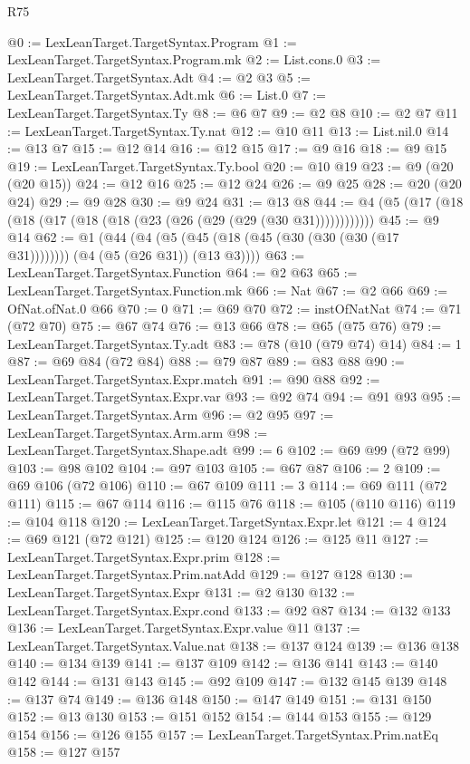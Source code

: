 \begin{lexlean}{R75}
\begin{coremodule}
@0 := LexLeanTarget.TargetSyntax.Program
@1 := LexLeanTarget.TargetSyntax.Program.mk
@2 := List.cons.{0}
@3 := LexLeanTarget.TargetSyntax.Adt
@4 := @2 @3
@5 := LexLeanTarget.TargetSyntax.Adt.mk
@6 := List.{0}
@7 := LexLeanTarget.TargetSyntax.Ty
@8 := @6 @7
@9 := @2 @8
@10 := @2 @7
@11 := LexLeanTarget.TargetSyntax.Ty.nat
@12 := @10 @11
@13 := List.nil.{0}
@14 := @13 @7
@15 := @12 @14
@16 := @12 @15
@17 := @9 @16
@18 := @9 @15
@19 := LexLeanTarget.TargetSyntax.Ty.bool
@20 := @10 @19
@23 := @9 (@20 (@20 @15))
@24 := @12 @16
@25 := @12 @24
@26 := @9 @25
@28 := @20 (@20 @24)
@29 := @9 @28
@30 := @9 @24
@31 := @13 @8
@44 := @4 (@5 (@17 (@18 (@18 (@17 (@18 (@18 (@23 (@26 (@29 (@29 (@30 @31))))))))))))
@45 := @9 @14
@62 := @1 (@44 (@4 (@5 (@45 (@18 (@45 (@30 (@30 (@30 (@17 @31)))))))) (@4 (@5 (@26 @31)) (@13 @3))))
@63 := LexLeanTarget.TargetSyntax.Function
@64 := @2 @63
@65 := LexLeanTarget.TargetSyntax.Function.mk
@66 := Nat
@67 := @2 @66
@69 := OfNat.ofNat.{0} @66
@70 := 0
@71 := @69 @70
@72 := instOfNatNat
@74 := @71 (@72 @70)
@75 := @67 @74
@76 := @13 @66
@78 := @65 (@75 @76)
@79 := LexLeanTarget.TargetSyntax.Ty.adt
@83 := @78 (@10 (@79 @74) @14)
@84 := 1
@87 := @69 @84 (@72 @84)
@88 := @79 @87
@89 := @83 @88
@90 := LexLeanTarget.TargetSyntax.Expr.match
@91 := @90 @88
@92 := LexLeanTarget.TargetSyntax.Expr.var
@93 := @92 @74
@94 := @91 @93
@95 := LexLeanTarget.TargetSyntax.Arm
@96 := @2 @95
@97 := LexLeanTarget.TargetSyntax.Arm.arm
@98 := LexLeanTarget.TargetSyntax.Shape.adt
@99 := 6
@102 := @69 @99 (@72 @99)
@103 := @98 @102
@104 := @97 @103
@105 := @67 @87
@106 := 2
@109 := @69 @106 (@72 @106)
@110 := @67 @109
@111 := 3
@114 := @69 @111 (@72 @111)
@115 := @67 @114
@116 := @115 @76
@118 := @105 (@110 @116)
@119 := @104 @118
@120 := LexLeanTarget.TargetSyntax.Expr.let
@121 := 4
@124 := @69 @121 (@72 @121)
@125 := @120 @124
@126 := @125 @11
@127 := LexLeanTarget.TargetSyntax.Expr.prim
@128 := LexLeanTarget.TargetSyntax.Prim.natAdd
@129 := @127 @128
@130 := LexLeanTarget.TargetSyntax.Expr
@131 := @2 @130
@132 := LexLeanTarget.TargetSyntax.Expr.cond
@133 := @92 @87
@134 := @132 @133
@136 := LexLeanTarget.TargetSyntax.Expr.value @11
@137 := LexLeanTarget.TargetSyntax.Value.nat
@138 := @137 @124
@139 := @136 @138
@140 := @134 @139
@141 := @137 @109
@142 := @136 @141
@143 := @140 @142
@144 := @131 @143
@145 := @92 @109
@147 := @132 @145 @139
@148 := @137 @74
@149 := @136 @148
@150 := @147 @149
@151 := @131 @150
@152 := @13 @130
@153 := @151 @152
@154 := @144 @153
@155 := @129 @154
@156 := @126 @155
@157 := LexLeanTarget.TargetSyntax.Prim.natEq
@158 := @127 @157

\end{coremodule}
\end{lexlean}
